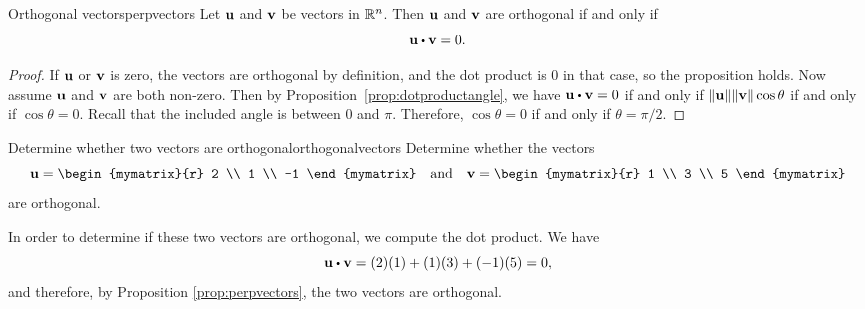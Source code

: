 \begin{proposition}{Orthogonal vectors}{perpvectors}
  Let $\mbox{\bf u}$ and $\mbox{\bf v}$ be vectors in $\mathbb{R}^n$. Then $\mbox{\bf u}$
  and $\mbox{\bf v}$ are orthogonal if and only
  if
  \begin{equation*}
    \vect{u} \dotprod \vect{v} = 0.
  \end{equation*}
\end{proposition}

\begin{proof}
  If $\mbox{\bf u}$ or $\mbox{\bf v}$ is zero, the vectors are orthogonal by
  definition, and the dot product is $0$ in that case, so the
  proposition holds. Now assume $\mbox{\bf u}$ and $\mbox{\bf v}$ are both
  non-zero.  Then by Proposition~\ref{prop:dotproductangle}, we have
  $\vect{u} \dotprod \vect{v} = 0$ if and only if
  $\|\mbox{\bf u}\| \|\mbox{\bf v}\| \cos \theta$ if and only if
  $\cos\theta=0$. Recall that the included angle is between $0$ and
  $\pi$. Therefore, $\cos\theta=0$ if and only if $\theta=\pi/2$.
\end{proof}

\begin{example}{Determine whether two vectors are orthogonal}{orthogonalvectors}
Determine whether the vectors
\begin{equation*}
\vect{u}=
\begin{mymatrix}{r}
2 \\
1 \\
-1 
\end{mymatrix}
\quad\mbox{and}\quad
\vect{v} 
=
\begin{mymatrix}{r}
1 \\
3 \\
5
\end{mymatrix}
\end{equation*}
are orthogonal.
\end{example}

\begin{solution}
  In order to determine if these two vectors are orthogonal, we
  compute the dot product. We have
  \begin{equation*}
    \vect{u} \dotprod \vect{v}
    =
    (2)(1) + (1)(3) + (-1)(5)
    =
    0,
  \end{equation*}
  and therefore, by Proposition \ref{prop:perpvectors}, the two vectors are orthogonal.
\end{solution}
